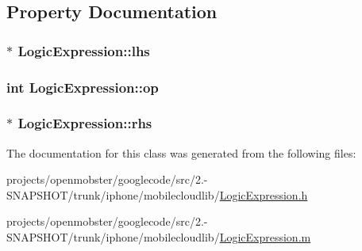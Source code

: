 \subsection{\-Property \-Documentation}
\hypertarget{interface_logic_expression_ac71111153d59f489e49e08671269d75c}{
\subsubsection[{lhs}]{ $\ast$ \-Logic\-Expression\-::lhs}}
\label{interface_logic_expression_ac71111153d59f489e49e08671269d75c}
\hypertarget{interface_logic_expression_a5246e5c685edbc060526dbb81a469916}{
\subsubsection[{op}]{\setlength{\rightskip}{0pt plus 5cm}int \-Logic\-Expression\-::op}}
\label{interface_logic_expression_a5246e5c685edbc060526dbb81a469916}
\hypertarget{interface_logic_expression_a5cc866390f4e5dbe2a2333b59f029f50}{
\subsubsection[{rhs}]{ $\ast$ \-Logic\-Expression\-::rhs}}
\label{interface_logic_expression_a5cc866390f4e5dbe2a2333b59f029f50}


\-The documentation for this class was generated from the following files\-:\begin{DoxyCompactItemize}
\item 
projects/openmobster/googlecode/src/2.-\/\-S\-N\-A\-P\-S\-H\-O\-T/trunk/iphone/mobilecloudlib/\hyperlink{_logic_expression_8h}{\-Logic\-Expression.\-h}\item 
projects/openmobster/googlecode/src/2.-\/\-S\-N\-A\-P\-S\-H\-O\-T/trunk/iphone/mobilecloudlib/\hyperlink{_logic_expression_8m}{\-Logic\-Expression.\-m}\end{DoxyCompactItemize}
